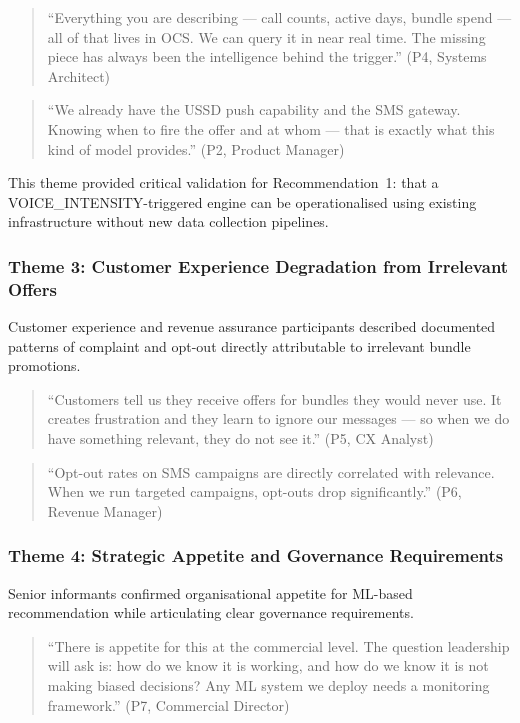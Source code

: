 \begin{quote}
``Everything you are describing --- call counts, active days, bundle spend --- all
of that lives in OCS. We can query it in near real time. The missing piece has
always been the intelligence behind the trigger.'' (P4, Systems Architect)
\end{quote}

\begin{quote}
``We already have the USSD push capability and the SMS gateway. Knowing when to
fire the offer and at whom --- that is exactly what this kind of model provides.''
(P2, Product Manager)
\end{quote}

This theme provided critical validation for Recommendation~1: that a
VOICE\_INTENSITY-triggered engine can be operationalised using existing
infrastructure without new data collection pipelines.

\subsubsection{Theme 3: Customer Experience Degradation from Irrelevant Offers}

Customer experience and revenue assurance participants described documented
patterns of complaint and opt-out directly attributable to irrelevant bundle
promotions.

\begin{quote}
``Customers tell us they receive offers for bundles they would never use. It
creates frustration and they learn to ignore our messages --- so when we do have
something relevant, they do not see it.'' (P5, CX Analyst)
\end{quote}

\begin{quote}
``Opt-out rates on SMS campaigns are directly correlated with relevance. When we
run targeted campaigns, opt-outs drop significantly.'' (P6, Revenue Manager)
\end{quote}

\subsubsection{Theme 4: Strategic Appetite and Governance Requirements}

Senior informants confirmed organisational appetite for ML-based recommendation
while articulating clear governance requirements.

\begin{quote}
``There is appetite for this at the commercial level. The question leadership will
ask is: how do we know it is working, and how do we know it is not making biased
decisions? Any ML system we deploy needs a monitoring framework.'' (P7, Commercial
Director)
\end{quote}

